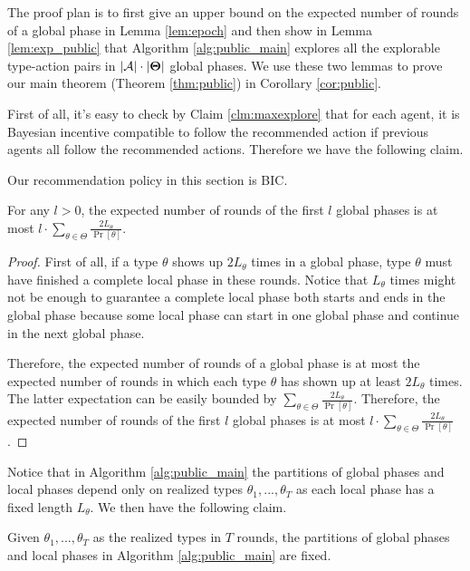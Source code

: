 The proof plan is to first give an upper bound on the expected number of rounds of a global phase in Lemma \ref{lem:epoch} and then show in Lemma \ref{lem:exp_public} that Algorithm \ref{alg:public_main} explores all the explorable type-action pairs in $|\mathcal{A}| \cdot |\bold{\Theta}|$ global phases. We use these two lemmas to prove our main theorem (Theorem \ref{thm:public}) in Corollary \ref{cor:public}.

First of all, it's easy to check by Claim \ref{clm:maxexplore} that for each agent, it is Bayesian incentive compatible to follow the recommended action if previous agents all follow the recommended actions. Therefore we have the following claim.
\begin{claim}
\label{clm:public_BIC}
Our recommendation policy in this section is BIC.
\end{claim}

\begin{lemma}
\label{lem:epoch}
For any $l>0$, the expected number of rounds of the first $l$ global phases is at most $l \cdot \sum_{\theta\in\varTheta} \frac{2L_{\theta}}{\Pr[\theta]}$.
\end{lemma}

\begin{proof}
First of all, if a type $\theta$ shows up $2L_{\theta}$ times in a global phase, type $\theta$ must have finished a complete local phase in these rounds. Notice that $L_{\theta}$ times might not be enough to guarantee a complete local phase both starts and ends in the global phase because some local phase can start in one global phase and continue in the next global phase.

Therefore, the expected number of rounds of a global phase is at most the expected number of rounds in which each type $\theta$ has shown up at least $2L_{\theta}$ times. The latter expectation can be easily bounded by $\sum_{\theta\in\varTheta} \frac{2L_{\theta}}{\Pr[\theta]}$. Therefore, the expected number of rounds of the first $l$ global phases is at most $l \cdot \sum_{\theta\in\varTheta} \frac{2L_{\theta}}{\Pr[\theta]}$.
\end{proof}

Notice that in Algorithm \ref{alg:public_main} the partitions of global phases and local phases depend only on realized types $\theta_1,...,\theta_T$ as each local phase has a fixed length $L_{\theta}$. We then have the following claim.
\begin{claim}
Given $\theta_1,...,\theta_T$ as the realized types in $T$ rounds, the partitions of global phases and local phases in Algorithm \ref{alg:public_main} are fixed.
\end{claim}


